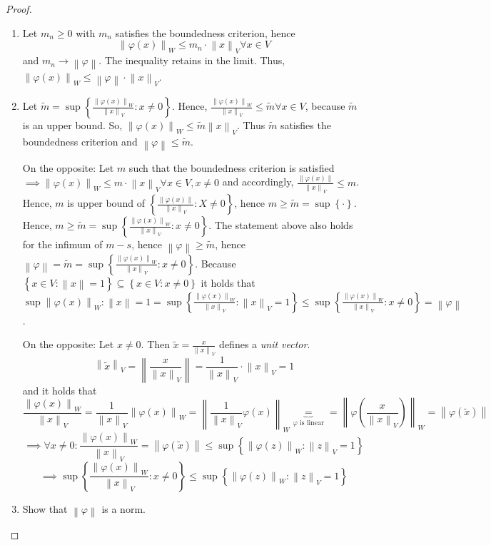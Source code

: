 \documentclass{article}
\newcommand{\set}[1]{\left\{#1\right\}}
\newcommand{\norm}[1]{\left\|#1\right\|}
\begin{document}
\begin{proof}
  \begin{enumerate}
    \item Let $m_n \geq 0$ with $m_n$ satisfies the boundedness criterion, hence
      \[ \norm{\varphi(x)}_W \leq m_n \cdot \norm{x}_V \forall x \in V \]
      and $m_n \to \norm{\varphi}$.
      The inequality retains in the limit. Thus, $\norm{\varphi(x)}_W \leq \norm{\varphi} \cdot \norm{x}_V$.
    \item Let $\tilde m = \sup\set{\frac{\norm{\varphi(x)}_W}{\norm{x}_V}: x \neq 0}$.
      Hence, $\frac{\norm{\varphi(x)}_W}{\norm{x}_V} \leq \tilde m \forall x \in V$, because $\tilde m$ is an upper bound.
      So, $\norm{\varphi(x)}_W \leq \tilde m \norm{x}_V$. Thus $\tilde m$ satisfies the boundedness criterion and $\norm{\varphi} \leq \tilde m$.

      On the opposite: Let $m$ such that the boundedness criterion is satisfied $\implies \norm{\varphi(x)}_W \leq m \cdot \norm{x}_V \forall x \in V, x \neq 0$
      and accordingly, $\frac{\norm{\varphi(x)}}{\norm{x}_V} \leq m$.
      Hence, $m$ is upper bound of $\set{\frac{\norm{\varphi(x)}}{\norm{x}_V} : X \neq 0}$, hence $m \geq \tilde m = \sup\set{\cdot}$.
      Hence, $m \geq \tilde m = \sup\set{\frac{\norm{\varphi(x)}_W}{\norm{x}_V}: x \neq 0}$.
      The statement above also holds for the infimum of $m-s$, hence $\norm{\varphi} \geq \tilde m$,
      hence $\norm{\varphi} = \tilde m = \sup\set{\frac{\norm{\varphi(x)}_W}{\norm{x}_V}: x \neq 0}$.
      Because $\set{x \in V: \norm{x} = 1} \subseteq \set{x \in V: x \neq 0}$ it holds that
      $\sup{\norm{\varphi(x)}_W: \norm{x} = 1} = \sup{\set{\frac{\norm{\varphi(x)}_W}{\norm{x}_V} : \norm{x}_V = 1}} \leq \sup\set{\frac{\norm{\varphi(x)}_W}{\norm{x}_V} : x \neq 0} = \norm{\varphi}$.

      On the opposite: Let $x \neq 0$. Then $\tilde x = \frac{x}{\norm{x}_V}$ defines a \emph{unit vector}.
      \[ \norm{\tilde x}_V = \norm{\frac{x}{\norm{x}_V}} = \frac{1}{\norm{x}_V} \cdot \norm{x}_V = 1 \]
      and it holds that
      \[ \frac{\norm{\varphi(x)}_W}{\norm{x}_V} = \frac{1}{\norm{x}_V} \norm{\varphi(x)}_W = \norm{\frac{1}{\norm{x}_V} \varphi(x)}_W \underbrace{=}_{\varphi \text{ is linear}} = \norm{\varphi(\frac{x}{\norm{x}_V})}_W = \norm{\varphi(\tilde x)} \]
      \[ \implies \forall x \neq 0: \frac{\norm{\varphi(x)}_W}{\norm{x}_V} = \norm{\varphi(\tilde x)} \leq \sup\set{\norm{\varphi(z)}_W: \norm{z}_V = 1} \]
      \[ \implies \sup\set{\frac{\norm{\varphi(x)}_W}{\norm{x}_V}: x \neq 0} \leq \sup\set{\norm{\varphi(z)}_W: \norm{z}_V = 1} \]
    \item Show that $\norm{\varphi}$ is a norm.


\end{enumerate}
\end{proof}
\end{document}
